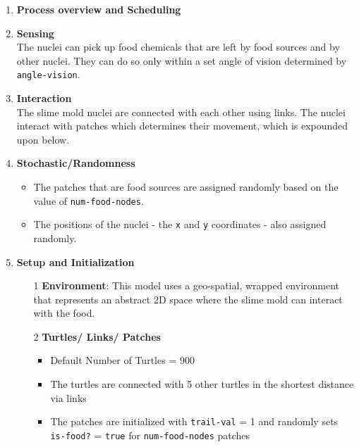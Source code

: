 \documentclass[a4paper, 11pt]{article}
\begin{document}
\begin{enumerate}
    
    \item \textbf{Process overview and Scheduling}
    \item \textbf{Sensing} \\
    The nuclei can pick up food chemicals that are left by food sources and by other nuclei. They can do so only within a set angle of vision determined by \texttt{angle-vision}. 
    \item \textbf{Interaction} \\
    The slime mold nuclei are connected with each other using links. The nuclei interact with patches which determines their movement, which is expounded upon below.  
    
   
    \item \textbf{Stochastic/Randomness } 
    \begin{itemize}
        \item The patches that are food sources are assigned randomly based on the value of \texttt{num-food-nodes}.
        \item The positions of the nuclei - the \texttt{x} and \texttt{y} coordinates - also assigned randomly.
    \end{itemize}
    \item \textbf{Setup and Initialization}
    \begin{itemize}
        \item[1] \textbf{Environment}:  This model uses a geo-spatial, wrapped environment that represents an abstract 2D space where the slime mold can interact with the food.
        \item[2] \textbf{Turtles/ Links/ Patches}
        \begin{itemize}
            \item Default Number of Turtles = 900
            \item The turtles are connected with 5 other turtles in the shortest distance via links
            \item The patches are initialized with \texttt{trail-val} = 1 and randomly sets \texttt{is-food?} = \texttt{true} for \texttt{num-food-nodes} patches 
        \end{itemize}
    \end{itemize}
   

\end{enumerate}
\end{document}
